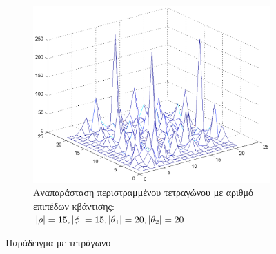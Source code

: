 \begin{figure}
        \centering
        \begin{subfigure}[b]{1\textwidth}
                \centerline{\includegraphics[scale = 0.3]{./images/examples/RotatedsmallerTetragwno(15152020).png}}
                \caption{Αναπαράσταση περιστραμμένου τετραγώνου με αριθμό επιπέδων κβάντισης: $\lvert\rho\rvert = 15,\lvert\phi\rvert = 15,\lvert\theta_1\rvert = 20,\lvert\theta_2\rvert = 20$}
        \end{subfigure}%
        \caption{Παράδειγμα με τετράγωνο}
        \label{fig:ex_rect}
\end{figure}

